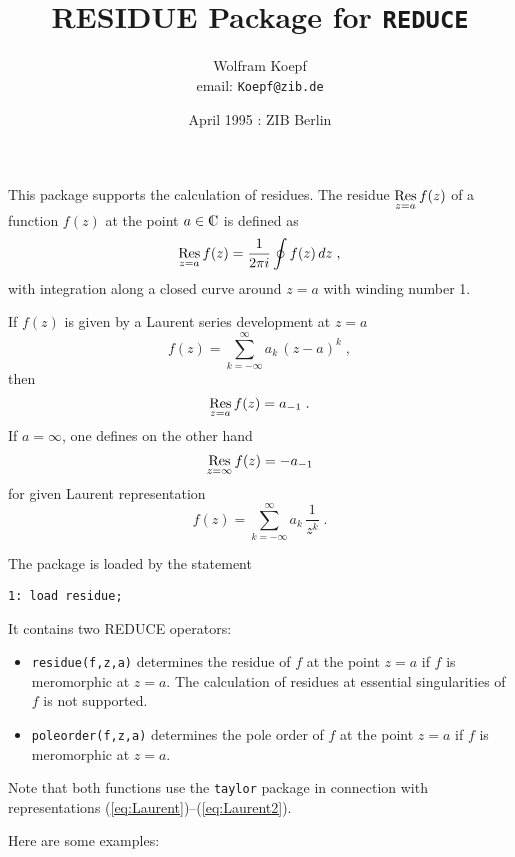 \title{{\bf RESIDUE Package for {\tt REDUCE}}}
\author{Wolfram Koepf\\ email: {\tt Koepf@zib.de}}
\date{April 1995 : ZIB Berlin}

\maketitle
\def\Res{\mathop{\rm Res}\limits}
\newcommand{\C}{{\rm {\mbox{C{\llap{{\vrule height1.52ex}\kern.4em}}}}}}

This package supports the calculation of residues. The residue
$\Res_{z=a} f(z)$ of a function $f(z)$ at the point $a\in\C$ is defined
as
\[
\Res_{z=a} f(z)=
\frac{1}{2 \pi i}\oint f(z)\,dz
\;,
\]
with integration along a closed curve around $z=a$ with winding number 1.

If $f(z)$ is given by a Laurent series development at $z=a$
\[
f(z)=\sum_{k=-\infty}^\infty a_k\,(z-a)^k
\;,
\]
then
\begin{equation}
\Res\limits_{z=a} f(z)=a_{-1}
\;.
\label{eq:Laurent}
\end{equation}
If $a=\infty$, one defines on the other hand
\begin{equation}
\Res\limits_{z=\infty} f(z)=-a_{-1}
\label{eq:Laurent2}
\end{equation}
for given Laurent representation
\[
f(z)=\sum_{k=-\infty}^\infty a_k\,\frac{1}{z^k}
\;.
\]

The package is loaded by the statement

\begin{verbatim}
1: load residue;
\end{verbatim}

It contains two REDUCE operators:

\begin{itemize}
\item
{\tt residue(f,z,a)} determines the residue of $f$ at the point $z=a$
if $f$ is meromorphic at $z=a$. The calculation of residues at essential
singularities of $f$ is not supported.
\item
{\tt poleorder(f,z,a)} determines the pole order of $f$ at the point $z=a$
if $f$ is meromorphic at $z=a$.
\end{itemize}
Note that both functions use the {\tt taylor} package in
connection with representations (\ref{eq:Laurent})--(\ref{eq:Laurent2}).

Here are some examples:

